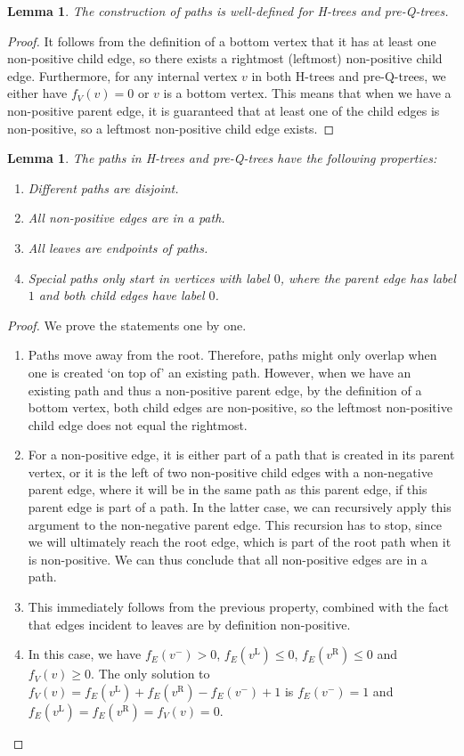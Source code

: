 \documentclass[11pt]{article}
\theoremstyle{plain}
\newtheorem{lemma}[theorem]{Lemma}
\theoremstyle{definition}
\begin{document}
\begin{lemma}
    The construction of paths is well-defined for H-trees and pre-Q-trees.
\end{lemma}
\begin{proof}
    It follows from the definition of a bottom vertex that it has at least one non-positive child edge, so there exists a rightmost (leftmost) non-positive child edge.
    Furthermore, for any internal vertex $v$ in both H-trees and pre-Q-trees, we either have $f_V(v)=0$ or $v$ is a bottom vertex.
    This means that when we have a non-positive parent edge, it is guaranteed that at least one of the child edges is non-positive, so a leftmost non-positive child edge exists.  
\end{proof}
\begin{lemma}
    The paths in H-trees and pre-Q-trees have the following properties:
    \begin{enumerate}[nosep]
        \item Different paths are disjoint.
        \item All non-positive edges are in a path.
        \item All leaves are endpoints of paths.
        \item Special paths only start in vertices with label $0$, where the parent edge has label $1$ and both child edges have label $0$.   
    \end{enumerate}
\end{lemma}
\begin{proof}
    We prove the statements one by one.
    \begin{enumerate}
        \item Paths move away from the root. 
        Therefore, paths might only overlap when one is created `on top of' an existing path. 
        However, when we have an existing path and thus a non-positive parent edge, by the definition of a bottom vertex, both child edges are non-positive, so the leftmost non-positive child edge does not equal the rightmost.
        \item For a non-positive edge, it is either part of a path that is created in its parent vertex, or it is the left of two non-positive child edges with a non-negative parent edge, where it will be in the same path as this parent edge, if this parent edge is part of a path.
        In the latter case, we can recursively apply this argument to the non-negative parent edge. 
        This recursion has to stop, since we will ultimately reach the root edge, which is part of the root path when it is non-positive.
        We can thus conclude that all non-positive edges are in a path.
        \item This immediately follows from the previous property, combined with the fact that edges incident to leaves are by definition non-positive.
        \item In this case, we have $f_E(v^-)>0$, $f_E(v^\textrm{L})\leq0$, $f_E(v^\textrm{R})\leq0$ and $f_V(v)\geq0$. 
        The only solution to $f_V(v)=f_E(v^\textrm{L})+f_E(v^\textrm{R}) - f_E(v^-)+1$ is $f_E(v^-)=1$ and $f_E(v^\textrm{L})=f_E(v^\textrm{R})=f_V(v)=0$.
    \end{enumerate}
\end{proof}
\end{document}
